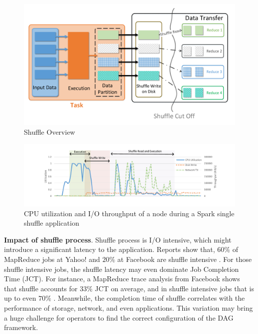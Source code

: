 \begin{figure}
	\centering
	\includegraphics[width=\linewidth]{fig/shuffle_process}
	\caption{Shuffle Overview}
	\label{fig:shuffle_process}
\end{figure}

\begin{figure}
	\includegraphics[width=\textwidth]{fig/util}
	\caption{CPU utilization and I/O throughput of a node during a Spark single shuffle application}
	\label{fig:util}
\end{figure}

\textbf{Impact of shuffle process}. Shuffle process is I/O intensive, which might introduce a significant latency to the application. Reports show that, $60\%$ of MapReduce jobs at Yahoo!
and $20\%$ at Facebook are shuffle intensive \cite{shufflewatcher}. For those shuffle intensive jobs, the shuffle latency may even dominate Job Completion Time (JCT). 
For instance, a MapReduce trace analysis from Facebook shows that shuffle accounts for $33\%$ JCT on average, and in shuffle intensive jobs that is up to even $70\%$ \cite{managing}.
Meanwhile, the completion time of shuffle correlates with the performance of storage, network, and even applications. 
This variation may bring a huge challenge for operators to find the correct configuration of the DAG framework.


